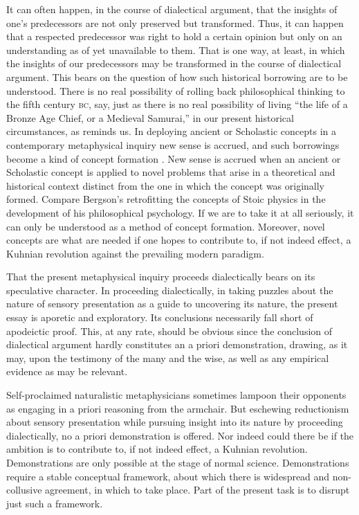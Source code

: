 It can often happen, in the course of dialectical argument, that the insights of one's predecessors are not only preserved but transformed. Thus, it can happen that a respected predecessor was right to hold a certain opinion but only on an understanding as of yet unavailable to them. That is one way, at least, in which the insights of our predecessors may be transformed in the course of dialectical argument. This bears on the question of how such historical borrowing are to be understood. There is no real possibility of rolling back philosophical thinking to the fifth century \textsc{bc}, say, just as there is no real possibility of living ``the life of a Bronze Age Chief, or a Medieval Samurai,'' in our present historical circumstances, as \citet[140]{Williams:1981rt} reminds us. In deploying ancient or Scholastic concepts in a contemporary metaphysical inquiry new sense is accrued, and such borrowings become a kind of concept formation \citep[587--8]{Moore:2012aa}. New sense is accrued when an ancient or Scholastic concept is applied to novel problems that arise in a theoretical and historical context distinct from the one in which the concept was originally formed. Compare Bergson's \citeyearpar{Bergson:1912pi} retrofitting the concepts of Stoic physics in the development of his philosophical psychology. If we are to take it at all seriously, it can only be understood as a method of concept formation. Moreover, novel concepts are what are needed if one hopes to contribute to, if not indeed effect, a Kuhnian revolution against the prevailing modern paradigm.

That the present metaphysical inquiry proceeds dialectically bears on its speculative character. In proceeding dialectically, in taking puzzles about the nature of sensory presentation as a guide to uncovering its nature, the present essay is aporetic and exploratory. Its conclusions necessarily fall short of apodeictic proof. This, at any rate, should be obvious since the conclusion of dialectical argument hardly constitutes an a priori demonstration, drawing, as it may, upon the testimony of the many and the wise, as well as any empirical evidence as may be relevant. 

Self-proclaimed naturalistic metaphysicians sometimes lampoon their opponents as engaging in a priori reasoning from the armchair. But eschewing reductionism about sensory presentation while pursuing insight into its nature by proceeding dialectically, no a priori demonstration is offered. Nor indeed could there be if the ambition is to contribute to, if not indeed effect, a Kuhnian revolution. Demonstrations are only possible at the stage of normal science. Demonstrations require a stable conceptual framework, about which there is widespread and non-collusive agreement, in which to take place. Part of the present task is to disrupt just such a framework.

